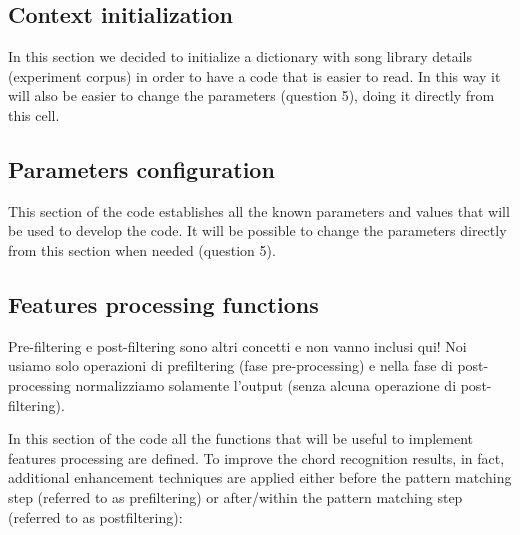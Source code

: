 \documentclass[
	12pt, %
]{fphw}
\begin{document}
\subsection*{Context initialization}
In this section we decided to initialize a dictionary with song library details (experiment corpus) in order to have a code that is easier to read. In this way it will also be easier to change the parameters (question 5), doing it directly from this cell.

\subsection*{Parameters configuration}
This section of the code establishes all the known parameters and values that will be used to develop the code. It will be possible to change the parameters directly from this section when needed (question 5).

\subsection*{Features processing functions}

\color{red}Pre-filtering e post-filtering sono altri concetti e non vanno inclusi qui! Noi usiamo solo operazioni di prefiltering (fase pre-processing) e nella fase di post-processing normalizziamo solamente l'output (senza alcuna operazione di post-filtering).\color{black}

In this section of the code all the functions that will be useful to implement features processing are defined. To improve the chord recognition results, in fact, additional enhancement techniques are applied either before the pattern matching step (referred to as prefiltering) or after/within the pattern matching step (referred to as postfiltering):
\end{document}
